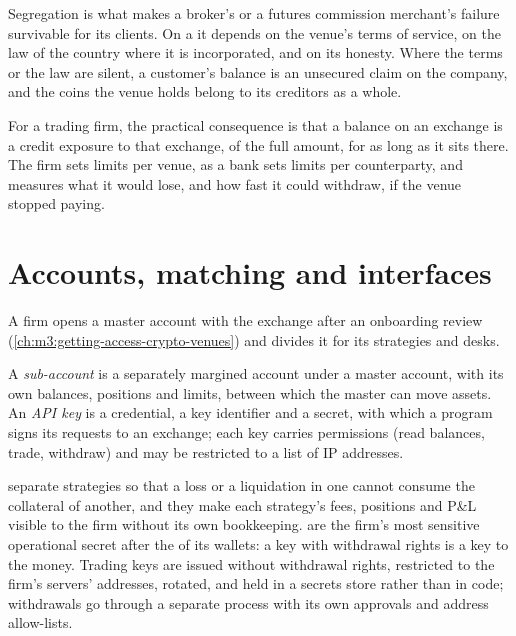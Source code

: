 Segregation is what makes a broker's or a futures commission merchant's failure survivable for its
clients. On a  it depends on the venue's terms of service, on the law of the
country where it is incorporated, and on its honesty. Where the terms or the law are silent, a
customer's balance is an unsecured claim on the company, and the coins the venue holds belong to its
creditors as a whole.

For a trading firm, the practical consequence is that a balance on an exchange is a credit exposure to
that exchange, of the full amount, for as long as it sits there. The firm sets limits per venue, as a
bank sets limits per counterparty, and measures what it would lose, and how fast it could withdraw, if
the venue stopped paying.

\section{Accounts, matching and interfaces}

A firm opens a master account with the exchange after an onboarding review (\cref{ch:m3:getting-access-crypto-venues})
and divides it for its strategies and desks.

\begin{definition}\label{def:m3:centralised-exchanges:subaccount}
A \emph{sub-account} is a separately margined account under a master account, with
its own balances, positions and limits, between which the master can move assets. An \emph{API
key} is a credential, a key identifier and a secret, with which a program signs its
requests to an exchange; each key carries permissions (read balances, trade, withdraw) and may be
restricted to a list of IP addresses.
\end{definition}

 separate strategies so that a loss or a liquidation in one cannot consume the collateral of
another, and they make each strategy's fees, positions and P\&L visible to the firm without its own
bookkeeping.  are the firm's most sensitive operational secret after the  of its
wallets: a key with withdrawal rights is a key to the money. Trading keys are issued without withdrawal
rights, restricted to the firm's servers' addresses, rotated, and held in a secrets store rather than in
code; withdrawals go through a separate process with its own approvals and address allow-lists.

